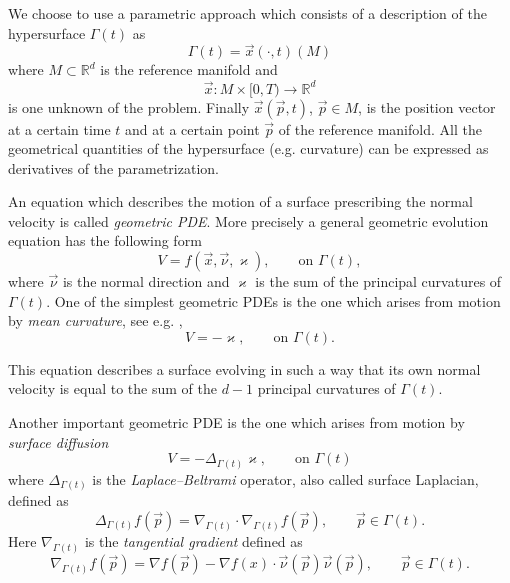 \documentclass[a4paper,11pt, onecolumn]{article}
\newcommand{\cor}[1]{\textit{#1}} %
\begin{document}
We choose to use a parametric approach which consists of a description
of the hypersurface $\Gamma(t)$ as
\begin{equation}\label{eq:parametric_hypersurface}
 \Gamma(t)=\vec{x}(\cdot,t)(M)
\end{equation}
where $M\subset\mathbb{R}^{d}$ is the reference manifold and
\begin{equation}\label{eq:position_vector}
 \vec{x}:M\times[0,T)\rightarrow\mathbb{R}^{d}
\end{equation}
is one unknown of the problem. Finally $\vec{x}(\vec{p},t)$, $\vec{p}\in M$, is
the position vector at a certain time $t$ and at a certain point $\vec{p}$ of
the reference manifold. All the geometrical quantities of the hypersurface (e.g.
curvature) can be expressed as derivatives of the parametrization.
\newline

An equation which describes the motion of a surface prescribing the normal
velocity is called \cor{geometric PDE}. More precisely a general geometric
evolution equation has the following form
\begin{equation}\label{eq:geometric_pde}
 V=f(\vec{x},\vec{\nu},\varkappa),\qquad\mbox{on }\Gamma(t),
\end{equation}
where $\vec{\nu}$ is the normal direction and $\varkappa$ is the sum of the
principal curvatures of $\Gamma(t)$. One of the simplest geometric PDEs is the
one which arises from motion by \cor{mean curvature}, see e.g.
\cite{DeckelnickDE05},
\begin{equation}\label{eq:mean_curvature}
 V=-\varkappa,\qquad\mbox{on }\Gamma(t).
\end{equation}

This equation describes a surface evolving in such a way that its own normal
velocity is equal to the sum of the $d-1$ principal curvatures of $\Gamma(t)$.
\newline

Another important geometric PDE is the one which arises from motion by
\cor{surface diffusion}
\begin{equation}\label{eq:surface_diff}
 V=-\Delta_{\Gamma(t)} \varkappa,\qquad\mbox{on }\Gamma(t)
\end{equation}
where $\Delta_{\Gamma(t)}$ is the \cor{Laplace--Beltrami} operator, also called
surface Laplacian, defined as
\begin{equation}\label{eq:laplace_beltrami}
 \Delta_{\Gamma(t)}f(\vec{p}) =
 \nabla_{\Gamma(t)}\cdot\nabla_{\Gamma(t)}f(\vec{p} ) ,\qquad
 \vec{p}\in\Gamma(t).
\end{equation}
Here $\nabla_{\Gamma(t)}$ is the \cor{tangential gradient} defined as
\begin{equation}\label{eq:tangent_gradient}
 \nabla_{\Gamma(t)}f(\vec{p})=\nabla f(\vec{p})-\nabla
 f(x)\cdot\vec{\nu}(\vec{p})\vec{\nu}(\vec{p}),\qquad \vec{p}\in\Gamma(t).
\end{equation}
\end{document}
